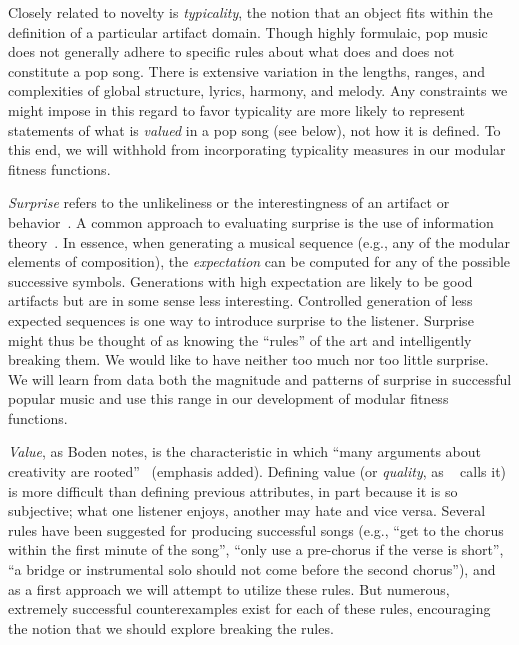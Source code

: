 \documentclass[11pt,phd]{byuprop}
\begin{document}
Closely related to novelty is \emph{typicality}, the notion that an object fits within the definition of a particular artifact domain. Though highly formulaic, pop music does not generally adhere to specific rules about what does and does not constitute a pop song. There is extensive variation in the lengths, ranges, and complexities of global structure, lyrics, harmony, and melody. Any constraints we might impose in this regard to favor typicality are more likely to represent statements of what is \emph{valued} in a pop song (see below), not how it is defined. To this end, we will withhold from incorporating typicality measures in our modular fitness functions.

\emph{Surprise} refers to the unlikeliness or the interestingness of an artifact or behavior~\cite{boden2004creative}. A common approach to evaluating surprise is the use of information theory~\cite{meyer2008emotion}. In essence, when generating a musical sequence (e.g., any of the modular elements of composition), the \emph{expectation} can be computed for any of the possible successive symbols. Generations with high expectation are likely to be good artifacts but are in some sense less interesting. Controlled generation of less expected sequences is one way to introduce surprise to the listener. Surprise might thus be thought of as knowing the ``rules'' of the art and intelligently breaking them. We would like to have neither too much nor too little surprise. We will learn from data both the magnitude and patterns of surprise in successful popular music and use this range in our development of modular fitness functions.

\emph{Value}, as Boden notes, is the characteristic in which ``many arguments about creativity are rooted''~\cite{boden2004creative} (emphasis added). Defining value (or \emph{quality}, as ~\cite{ritchie2007some} calls it) is more difficult than defining previous attributes, in part because it is so subjective; what one listener enjoys, another may hate and vice versa. Several rules have been suggested for producing successful songs (e.g., ``get to the chorus within the first minute of the song'', ``only use a pre-chorus if the verse is short'', ``a bridge or instrumental solo should not come before the second chorus''), and as a first approach we will attempt to utilize these rules. But numerous, extremely successful counterexamples exist for each of these rules, encouraging the notion that we should explore breaking the rules.
\end{document}
